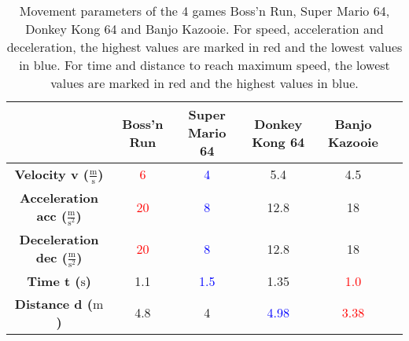 \documentclass[letterpaper, 10 pt, conference]{ieeeconf}  %
\begin{document}
\begin{table*}[htbp]
    \centering
    \begin{tabular}{cccccc}
    \toprule
     & \textbf{Boss'n Run} & \textbf{Super Mario 64} & \textbf{Donkey Kong 64} & \textbf{Banjo Kazooie} \\
    \midrule
    \textbf{Velocity v ($\frac{\mathrm{m}}{\mathrm{s}}$)} & \textcolor{red}{6} & \textcolor{blue}{4} & 5.4 & 4.5 \\
    \textbf{Acceleration acc ($\frac{\mathrm{m}}{\mathrm{s^2}}$)} & \textcolor{red}{20} & \textcolor{blue}{8} & 12.8 & 18 \\
    \textbf{Deceleration dec ($\frac{\mathrm{m}}{\mathrm{s^2}}$)} & \textcolor{red}{20} & \textcolor{blue}{8} & 12.8 & 18 \\
    \textbf{Time t ($\mathrm{s}$)} & 1.1 & \textcolor{blue}{1.5} & 1.35 & \textcolor{red}{1.0} \\
    \textbf{Distance d ($\mathrm{m}$)} & 4.8 & 4 & \textcolor{blue}{4.98} & \textcolor{red}{3.38} \\
    \bottomrule
    \end{tabular}
    \caption{Movement parameters of the 4 games Boss'n Run, Super Mario 64, Donkey Kong 64 and Banjo Kazooie. 
    For speed, acceleration and deceleration, the highest values are marked in red and the lowest values in blue.
    For time and distance to reach maximum speed, the lowest values are marked in red and the highest values in blue.}
    \label{tab:insightII}
\end{table*}
\end{document}
